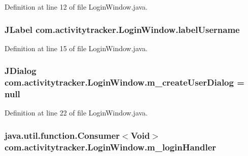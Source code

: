 Definition at line 12 of file Login\+Window.\+java.

\subsubsection[{\texorpdfstring{label\+Username}{labelUsername}}]{\setlength{\rightskip}{0pt plus 5cm}J\+Label com.\+activitytracker.\+Login\+Window.\+label\+Username\hspace{0.3cm}{\ttfamily [private]}}\hypertarget{classcom_1_1activitytracker_1_1_login_window_a4999e1461716e42ee4e3de8e3eb47eb9}{}\label{classcom_1_1activitytracker_1_1_login_window_a4999e1461716e42ee4e3de8e3eb47eb9}


Definition at line 15 of file Login\+Window.\+java.

\subsubsection[{\texorpdfstring{m\+\_\+create\+User\+Dialog}{m_createUserDialog}}]{\setlength{\rightskip}{0pt plus 5cm}J\+Dialog com.\+activitytracker.\+Login\+Window.\+m\+\_\+create\+User\+Dialog = null\hspace{0.3cm}{\ttfamily [private]}}\hypertarget{classcom_1_1activitytracker_1_1_login_window_a49ff7093e29ce7bd22c42ac8099d5d34}{}\label{classcom_1_1activitytracker_1_1_login_window_a49ff7093e29ce7bd22c42ac8099d5d34}


Definition at line 22 of file Login\+Window.\+java.

\subsubsection[{\texorpdfstring{m\+\_\+login\+Handler}{m_loginHandler}}]{\setlength{\rightskip}{0pt plus 5cm}java.\+util.\+function.\+Consumer$<$Void$>$ com.\+activitytracker.\+Login\+Window.\+m\+\_\+login\+Handler\hspace{0.3cm}{\ttfamily [private]}}\hypertarget{classcom_1_1activitytracker_1_1_login_window_aab28a8e6372499a8690d524dedeaf9e1}{}\label{classcom_1_1activitytracker_1_1_login_window_aab28a8e6372499a8690d524dedeaf9e1}


